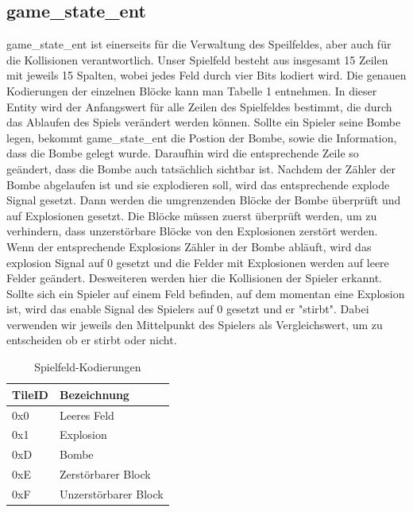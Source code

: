 \documentclass[parskip=full]{scrartcl}
\begin{document}
			\subsection{game\_state\_ent}
				game\_state\_ent ist einerseits für die Verwaltung des Speilfeldes, aber auch für die Kollisionen verantwortlich. Unser Spielfeld besteht aus insgesamt 15 Zeilen mit jeweils 15 Spalten, wobei jedes Feld durch vier Bits kodiert wird. Die genauen Kodierungen der einzelnen Blöcke kann man Tabelle 1 entnehmen. In dieser Entity wird der Anfangswert für alle Zeilen des Spielfeldes bestimmt, die durch das Ablaufen des Spiels verändert werden können. \newline
				Sollte ein Spieler seine Bombe legen, bekommt game\_state\_ent die Postion der Bombe, sowie die Information, dass die Bombe gelegt wurde. Daraufhin wird die entsprechende Zeile so geändert, dass die Bombe auch tatsächlich sichtbar ist. Nachdem der Zähler der Bombe abgelaufen ist und sie explodieren soll, wird das entsprechende explode Signal gesetzt. Dann werden die umgrenzenden Blöcke der Bombe überprüft und auf Explosionen gesetzt. Die Blöcke müssen zuerst überprüft werden, um zu verhindern, dass unzerstörbare Blöcke von den Explosionen zerstört werden. Wenn der entsprechende Explosions Zähler in der Bombe abläuft, wird das explosion Signal auf 0 gesetzt und die Felder mit Explosionen werden auf leere Felder geändert. \newline
				Desweiteren werden hier die Kollisionen der Spieler erkannt. Sollte sich ein Spieler auf einem Feld befinden, auf dem momentan eine Explosion ist, wird das enable Signal des Spielers auf 0 gesetzt und er "stirbt". Dabei verwenden wir jeweils den Mittelpunkt des Spielers als Vergleichswert, um zu entscheiden ob er stirbt oder nicht. \newline
				
				\begin{table}[]
					\centering
					\caption{Spielfeld-Kodierungen}
					\label{tileCode}
					\begin{tabular}{|l|l|}
						\hline
						\textbf{TileID} & \textbf{Bezeichnung}      \\ \hline
						0x0           & Leeres Feld               \\ \hline
						0x1           & Explosion                 \\ \hline
						0xD           & Bombe                     \\ \hline
						0xE           & Zerstörbarer Block        \\ \hline
						0xF           & Unzerstörbarer Block      \\ \hline
					\end{tabular}
				\end{table}
		
\end{document}
